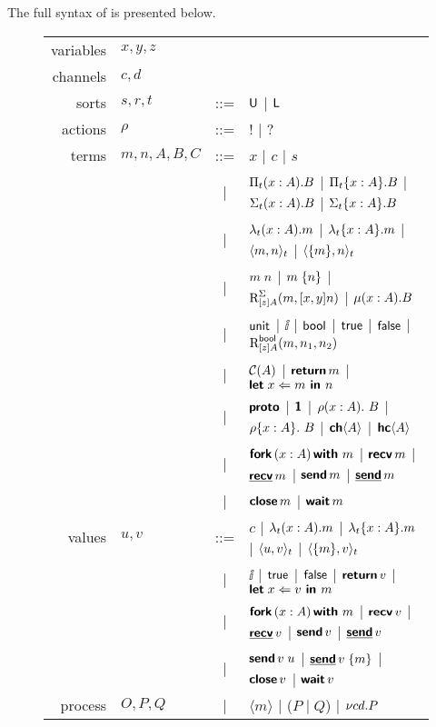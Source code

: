 The full syntax of \TLLC{} is presented below.

\begin{figure}[H]
  \begin{tabular}{r l c l}
    variables & $x, y, z$   &     &                 \\
    channels  & $c, d$      &     &                 \\
    sorts     & $s, r, t$   & ::= & $\textsf{U}$ | $\textsf{L}$   \\
    actions   & $\rho$      & ::= & $!$ | $?$       \\
    terms     & $m,n,A,B,C$ & ::= & $x$ | $c$ | $s$ \\
              &             & \;| & $\Pi_{t}({x : A}).{B}$ | $\Pi_{t}\{{x : A}\}.{B}$
                                    | $\Sigma_{t}({x : A}).{B}$ | $\Sigma_{t}\{{x : A}\}.{B}$ \\
              &             & \;| & $\lambda_{t}({x : A}).{m}$ | $\lambda_{t}\{{x : A}\}.{m}$
                                    | $\langle{{m},{n}}\rangle_{t}$ | $\langle{\{{m}\},{n}}\rangle_{t}$ \\
              &             & \;| & ${m}\;{n}$ | ${m}\;\{{n}\}$ | $\text{R}_{[z]A}^{\Sigma}({m},{[x,y]n})$ | $\mu({x : A}).{B}$ \\
              &             & \;| & $\textsf{unit}$ | $\ii$ | $\textsf{bool}$ | $\textsf{true}$ | $\textsf{false}$
                                    | $\text{R}_{[z]A}^{\textsf{bool}}({m},{n_{1}},{n_{2}})$ \\
              &             & \;| & $\mathcal{C}({A})$ | $\textbf{\textsf{return}}\,{m}$ | $\textbf{\textsf{let}}\;{x}\Leftarrow{m}\textbf{\textsf{ in }}{n}$ \\
              &             & \;| & $\textbf{\textsf{proto}}$ | $\textbf{\textsf{1}}$
                                    | ${{\rho}({x : A}).\ {B}}$ | ${{\rho}\{{x : A}\}.\ {B}}$ | ${\textbf{\textsf{ch}}\langle{A}\rangle}$ | ${\textbf{\textsf{hc}}\langle{A}\rangle}$ \\
              &             & \;| & $\textbf{\textsf{fork}}\,({x : A})\,\textbf{\textsf{with}}\ {m}$ | $\textbf{\textsf{recv}}\,{m}$ | $\underline{\textbf{\textsf{recv}}}\,{m}$
                                    | $\textbf{\textsf{send}}\,{m}$ | $\underline{\textbf{\textsf{send}}}\,{m}$ \\
              &             & \;| & $\textbf{\textsf{close}}\,{m}$ | $\textbf{\textsf{wait}}\,{m}$ \\
    values    & $u, v$      & ::= & $c$ | $\lambda_{t}({x : A}).{m}$ | $\lambda_{t}\{{x : A}\}.{m}$
                                    | $\langle{{u},{v}}\rangle_{t}$ | $\langle{\{{m}\},{v}}\rangle_{t}$ \\
              &             & \;| & $\ii$ | $\textsf{true}$ | $\textsf{false}$ | $\textbf{\textsf{return}}\,{v}$ | $\textbf{\textsf{let}}\;{x}\Leftarrow{v}\textbf{\textsf{ in }}{m}$ \\
              &             & \;| & $\textbf{\textsf{fork}}\,({x : A})\,\textbf{\textsf{with}}\ {m}$ | $\textbf{\textsf{recv}}\,{v}$ | $\underline{\textbf{\textsf{recv}}}\,{v}$ | $\textbf{\textsf{send}}\,{v}$ | $\underline{\textbf{\textsf{send}}}\,{v}$ \\
              &             & \;| & ${\textbf{\textsf{send}}\,{v}}\;{u}$ | ${\underline{\textbf{\textsf{send}}}\,{v}}\;\{{m}\}$ | $\textbf{\textsf{close}}\,{v}$ | $\textbf{\textsf{wait}}\,{v}$ \\
    process   & $O, P, Q$   & \;| & $\langle m \rangle$ | ($P \mid Q$) | ${\nu{cd}.{P}}$
  \end{tabular}
\end{figure}

